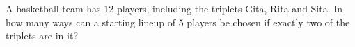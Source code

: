 A basketball team has $12$ players, including the triplets Gita, Rita and Sita. In how many ways can a starting lineup of $5$ players be chosen if exactly two of the triplets are in it?

